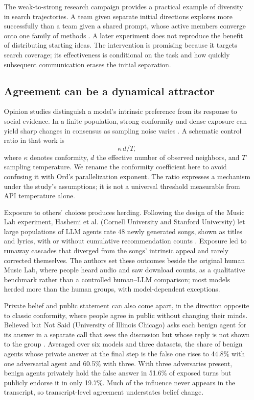 The weak-to-strong research campaign provides a practical example of diversity in search trajectories. A team given separate initial directions explores more successfully than a team given a shared prompt, whose active members converge onto one family of methods \citep{automated-w2s-researcher}. A later experiment does not reproduce the benefit of distributing starting ideas. The intervention is promising because it targets search coverage; its effectiveness is conditional on the task and how quickly subsequent communication erases the initial separation.

\subsection{Agreement can be a dynamical attractor}
Opinion studies distinguish a model's intrinsic preference from its response to social evidence. In a finite population, strong conformity and dense exposure can yield sharp changes in consensus as sampling noise varies \citep{okawa-biased-consensus}. A schematic control ratio in that work is
\begin{equation}
\kappa\,d/T,
\end{equation}
where $\kappa$ denotes conformity, $d$ the effective number of observed neighbors, and $T$ sampling temperature. We rename the conformity coefficient here to avoid confusing it with Ord's parallelization exponent. The ratio expresses a mechanism under the study's assumptions; it is not a universal threshold measurable from API temperature alone.

Exposure to others' choices produces herding. Following the design of the Music Lab experiment, Hashemi et al. (Cornell University and Stanford University) let large populations of LLM agents rate 48 newly generated songs, shown as titles and lyrics, with or without cumulative recommendation counts \citep{herding-runaway-cascades}. Exposure led to runaway cascades that diverged from the songs' intrinsic appeal and rarely corrected themselves. The authors set these outcomes beside the original human Music Lab, where people heard audio and saw download counts, as a qualitative benchmark rather than a controlled human--LLM comparison; most models herded more than the human groups, with model-dependent exceptions.

Private belief and public statement can also come apart, in the direction opposite to classic conformity, where people agree in public without changing their minds. Believed but Not Said (University of Illinois Chicago) asks each benign agent for its answer in a separate call that sees the discussion but whose reply is not shown to the group \citep{believed-but-not-said}. Averaged over six models and three datasets, the share of benign agents whose private answer at the final step is the false one rises to 44.8\% with one adversarial agent and 60.5\% with three. With three adversaries present, benign agents privately hold the false answer in 51.6\% of exposed turns but publicly endorse it in only 19.7\%. Much of the influence never appears in the transcript, so transcript-level agreement understates belief change.

